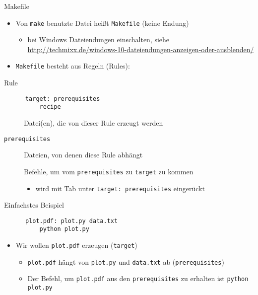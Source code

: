 \begin{frame}[fragile]{Makefile}
  \begin{itemize}
    \item Von \texttt{make} benutzte Datei heißt \texttt{Makefile} (keine Endung)
      \begin{itemize}
        \item bei Windows Dateiendungen einschalten, siehe 
          \url{http://techmixx.de/windows-10-dateiendungen-anzeigen-oder-ausblenden/}
      \end{itemize}
    \item \texttt{Makefile} besteht aus Regeln (Rules):
  \end{itemize}
  \begin{block}{Rule}
    \centering
    \begin{verbatim}
      target: prerequisites
          recipe
    \end{verbatim}
  \end{block}
  \begin{description}
    \item[\texttt{\hphantom{prerequisites}}] Datei(en), die von dieser Rule erzeugt werden
    \item[\texttt{prerequisites}]                         Dateien, von denen diese Rule abhängt
    \item[\texttt{\hphantom{prerequisites}}] Befehle, um vom \texttt{prerequisites} zu \texttt{target} zu kommen
    \begin{itemize}
      \item wird mit Tab unter \texttt{target: prerequisites} eingerückt
    \end{itemize}
  \end{description}
\end{frame}

\begin{frame}[fragile]{Einfachstes Beispiel}
  \begin{center}
    \begin{verbatim}
      plot.pdf: plot.py data.txt
          python plot.py
    \end{verbatim}
  \end{center}
  \begin{itemize}
    \item Wir wollen \texttt{plot.pdf} erzeugen (\texttt{target})
    \begin{itemize}
      \item \texttt{plot.pdf} hängt von \texttt{plot.py} und \texttt{data.txt} ab (\texttt{prerequisites})
      \item Der Befehl, um \texttt{plot.pdf} aus den \texttt{prerequisites} zu erhalten ist \texttt{python plot.py}
    \end{itemize}
  \end{itemize}
\end{frame}

